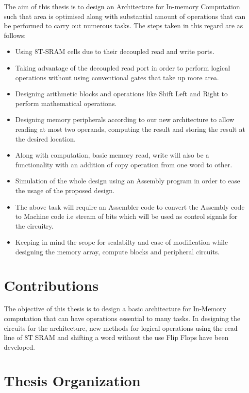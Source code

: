 The aim of this thesis is to design an Architecture for In-memory Computation such that area is optimised along with substantial amount of operations that can be performed to carry out numerous tasks. The steps taken in this regard are as follows:
\begin{itemize}
  \item Using 8T-SRAM cells due to their decoupled read and write ports.
  \item Taking advantage of the decoupled read port in order to perform logical operations without using conventional gates that take up more area.
  \item Designing arithmetic blocks and operations like Shift Left and Right to perform mathematical operations. 
  \item Designing memory peripherals according to our new architecture to allow reading at most two operands, computing the result and storing the result at the desired location.
  \item Along with computation, basic memory read, write will also be a functionality with an addition of copy operation from one word to other.
  \item Simulation of the whole design using an Assembly program in order to ease the usage of the proposed design. 
  \item The above task will require an Assembler code to convert the Assembly code to Machine code i.e stream of bits which will be used as control signals for the circuitry.
  \item Keeping in mind the scope for scalabilty and ease of modification while designing the memory array, compute blocks and peripheral circuits.
\end{itemize}

\section{Contributions}
\paragraph{}
The objective of this thesis is to design a basic architecture for In-Memory computation that can have operations essential to many tasks. In designing the circuits for the architecture, new methods for logical operations using the read line of 8T SRAM and shifting a word without the use Flip Flops have been developed.

\section{Thesis Organization}
